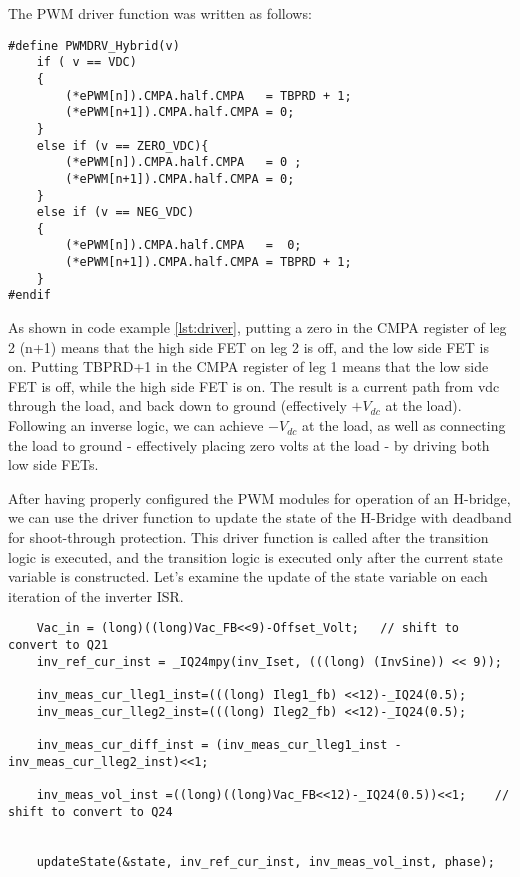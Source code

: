 The PWM driver function was written as follows:
\begin{lstlisting}[label={lst:driver}]
#define PWMDRV_Hybrid(v)
	if ( v == VDC)
	{
		(*ePWM[n]).CMPA.half.CMPA	= TBPRD + 1;
		(*ePWM[n+1]).CMPA.half.CMPA	= 0;
	}
	else if (v == ZERO_VDC){
		(*ePWM[n]).CMPA.half.CMPA	= 0 ;
		(*ePWM[n+1]).CMPA.half.CMPA	= 0;
	}
	else if (v == NEG_VDC)
	{
		(*ePWM[n]).CMPA.half.CMPA	=  0;
		(*ePWM[n+1]).CMPA.half.CMPA	= TBPRD + 1;
	}
#endif
\end{lstlisting}

As shown in code example \ref{lst:driver}, putting a zero in the CMPA register of leg 2 (n+1) means that the high side FET on leg 2 is off, and the low side FET is on. Putting TBPRD+1 in the CMPA register of  leg 1 means that the low side FET is off, while the high side FET is on. 
The result is a current path from vdc through the load, and back down to ground (effectively $+V_{dc}$ at the load). Following an inverse logic, we can achieve $-V_{dc}$ at the load, as well as connecting the load to ground - effectively placing zero volts at the load - by driving both low side FETs.

After having properly configured the PWM modules for operation of an H-bridge, we can use the driver function to update the state of the H-Bridge with deadband for shoot-through protection. This driver function is called after the transition logic is executed, and the transition logic is executed only after the current state variable is constructed. Let's examine the update of the state variable on each iteration of the inverter ISR. 

\begin{lstlisting}
	Vac_in = (long)((long)Vac_FB<<9)-Offset_Volt;	// shift to convert to Q21
	inv_ref_cur_inst = _IQ24mpy(inv_Iset, (((long) (InvSine)) << 9));

	inv_meas_cur_lleg1_inst=(((long) Ileg1_fb) <<12)-_IQ24(0.5);
	inv_meas_cur_lleg2_inst=(((long) Ileg2_fb) <<12)-_IQ24(0.5);

	inv_meas_cur_diff_inst = (inv_meas_cur_lleg1_inst - inv_meas_cur_lleg2_inst)<<1;

	inv_meas_vol_inst =((long)((long)Vac_FB<<12)-_IQ24(0.5))<<1;	// shift to convert to Q24


	updateState(&state, inv_ref_cur_inst, inv_meas_vol_inst, phase);
\end{lstlisting}
 
